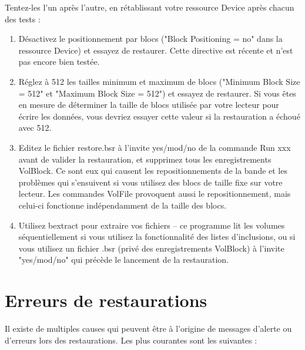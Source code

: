 Tentez-les l'un apr\`es l'autre, en r\'etablissant votre ressource Device apr\`es 
chacun des tests :

\begin{enumerate}
\item D\'esactivez le positionnement par blocs ("Block Positioning = no" 
   dans la ressource Device) et essayez de restaurer. Cette directive est 
   r\'ecente et n'est pas encore bien test\'ee.
\item R\'eglez \`a 512 les tailles minimum et maximum de blocs  
   ("Minimum Block Size = 512" et "Maximum  Block Size = 512") et essayez de 
   restaurer. Si vous \^etes en mesure de d\'eterminer la taille de blocs 
   utilis\'ee par votre lecteur pour \'ecrire les donn\'ees, vous devriez essayer 
   cette valeur si la restauration a \'echou\'e avec 512. 
\item Editez le fichier restore.bsr \`a l'invite yes/mod/no de la 
   commande Run xxx avant de valider la restauration, et supprimez tous les 
   enregistrements VolBlock. Ce sont eux qui causent les repositionnements de 
   la bande et les probl\`emes qui s'ensuivent si vous utilisez des blocs de taille 
   fixe sur votre lecteur. Les commandes VolFile provoquent aussi le 
   repositionnement, mais celui-ci fonctionne ind\'ependamment de la taille des blocs.
\item Utilisez bextract pour extraire vos fichiers -- ce programme lit les 
   volumes s\'equentiellement si vous utilisez la fonctionnalit\'e des listes 
   d'inclusions, ou si vous utilisez un fichier .bsr (priv\'e des enregistrements 
   VolBlock) \`a l'invite "yes/mod/no" qui pr\'ec\`ede le lancement de la 
   restauration.
\end{enumerate}

\section{Erreurs de restaurations}

Il existe de multiples causes qui peuvent \^etre \`a l'origine de messages d'alerte ou d'erreurs 
lors des restaurations. Les plus courantes sont les suivantes :

